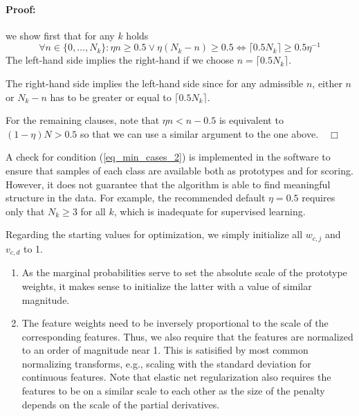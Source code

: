 \paragraph{Proof:} we show first that for any $k$ holds
%
\begin{equation}
\forall n\in\{0,\dots,N_k\}:\eta n\geq0.5\vee\eta(N_k-n)\geq0.5\iff\lceil0.5N_k\rceil\geq0.5\eta^{-1}\label{eq_condition_proof}
\end{equation}
%
The left-hand side implies the right-hand if we choose $n=\lceil0.5N_k\rceil$.\par
%
The right-hand side implies the left-hand side since for any admissible $n$, either $n$ or $N_k-n$ has to be greater or equal to $\lceil0.5N_k\rceil$.\par
%
For the remaining clauses, note that $\eta n<n-0.5$ is equivalent to $(1-\eta)N>0.5$ so that we can use a similar argument to the one above.$\quad\Box$\par
%
A check for condition (\ref{eq_min_cases_2}) is implemented in the software to ensure that samples of each class are available both as prototypes and for scoring.
However, it does not guarantee that the algorithm is able to find meaningful structure in the data.
For example, the recommended default $\eta=0.5$ requires only that $N_k\geq3$ for all $k$, which is inadequate for supervised learning.\par
%
Regarding the starting values for optimization, we simply initialize all $w_{c,j}$ and $v_{c,d}$ to 1.
%
\begin{remark}
\begin{enumerate}
\item As the marginal probabilities serve to set the absolute scale of the prototype weights, it makes sense to initialize the latter with a value of similar magnitude.
%
\item The feature weights need to be inversely proportional to the scale of the corresponding features.
Thus, we also require that the features are normalized to an order of magnitude near 1.
This is satisified by most common normalizing transforms, e.g., scaling with the standard deviation for continuous features.
Note that elastic net regularization also requires the features to be on a similar scale to each other as the size of the penalty depends on the scale of the partial derivatives.
\end{enumerate}
\end{remark}



\endinput
